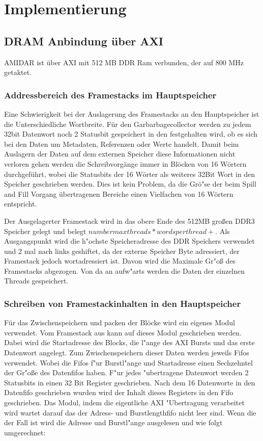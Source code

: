 \chapter{Implementierung}
\label{cha:Implementierung}
\section{DRAM Anbindung \"uber AXI}
AMIDAR ist \"uber AXI mit 512 MB DDR Ram verbunden, der auf 800 MHz getaktet.


\subsection{Addressbereich des Framestacks im Hauptspeicher}
Eine Schwierigkeit bei der Auslagerung des Framestacks an den Hauptspeicher ist die Unterschiedliche Wortbreite. 
F\"ur den Garbarbagecollector werden zu jedem 32bit Datenwort noch 2 Statusbit gespeichert in den festgehalten wird, ob es sich bei den Daten um Metadaten, Referenzen oder Werte handelt. Damit beim Auslagern der Daten auf dem externen Speicher diese Informationen nicht verloren gehen werden die Schreibvorg\"ange immer in Bl\"ocken von 16 W\"ortern durchgef\"uhrt, wobei die Statusbits der 16 W\"orter als weiteres 32Bit Wort in den Speicher geschrieben werden. Dies ist kein Problem, da die Gr\"o"se der beim Spill and Fill Vorgang \"ubertragenen Bereiche einen Vielfachen von 16 W\"ortern entspricht. 

Der Ausgelagerter Framestack wird in das obere Ende des 512MB großen DDR3 Speicher gelegt und belegt  $number max threads * words per thread +  $.
Als Ausgangspunkt wird die h"ochste Speicheradresse des DDR Speichers verwendet und 2 mal nach links geshiftet, da der externe Speicher Byte adressiert, der Framestack jedoch wortadressiert ist. Davon wird die Maximale Gr"o{\ss} des Framestacks abgezogen. Von da an aufw"arts werden die Daten der einzelnen Threads gespeichert.

\subsection{Schreiben von Framestackinhalten in den Hauptspeicher}
F\"ur das Zwischenspeichern und packen der Bl\"ocke wird ein eigenes Modul verwendet.
Vom Framestack aus kann auf dieses Modul geschrieben werden. Dabei wird die Startadresse des Blocks, die l"ange des AXI Bursts und das erste Datenwort angelegt. Zum Zwischenspeichern dieser Daten werden jeweils Fifos verwendet. Wobei die Fifos f"ur Burstl"ange und Startadresse einen Sechzehntel der Gr"o{\ss}e des Datenfifos haben. F"ur jedes "ubertragene Datenwort werden 2 Statusbits in einen 32 Bit Register geschrieben. Nach dem 16 Datenworte in den Datenfifo geschrieben wurden wird der Inhalt dieses Registers in den Fifo geschrieben. 
Das Modul, indem die eigentliche AXI "Ubertragung verarbeitet wird wartet darauf das der Adress- und Burstlengthfifo nicht leer sind. Wenn die der Fall ist wird die Adresse und Burstl"ange ausgelesen und wie folgt umgerechnet:

